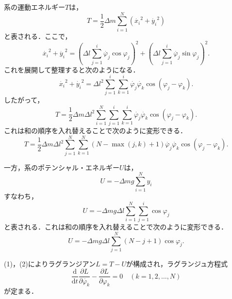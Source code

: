 \documentclass[11pt, a4paper]{ltjsarticle}
\begin{document}
系の運動エネルギー$T$は，
\begin{equation*}
  T = \frac{1}{2} \Delta m \sum_{i = 1}^{N} \left(\dot{x_i}^2 + \dot{y_i}^2\right)
\end{equation*}
と表される．ここで，
\begin{equation*}
  \dot{x_i}^2 + \dot{y_i}^2
  = \left(\Delta l \sum_{j = 1}^{i} \dot{\varphi_j} \cos \varphi_j\right)^2
  + \left(\Delta l \sum_{j = 1}^{i} \dot{\varphi_j} \sin \varphi_j\right)^2.
\end{equation*}
これを展開して整理すると次のようになる．
\begin{equation*}
  \dot{x_i}^2 + \dot{y_i}^2
  = {\Delta l}^2 \sum_{j = 1}^{i} \sum_{k = 1}^{i}
    \dot{\varphi_j} \dot{\varphi_k} \cos \left(\varphi_j - \varphi_k\right).
\end{equation*}
したがって，
\begin{equation*}
  T = \frac{1}{2} \Delta m {\Delta l}^2
      \sum_{i = 1}^{N} \sum_{j = 1}^{i} \sum_{k = 1}^{i}
      \dot{\varphi_j} \dot{\varphi_k} \cos \left(\varphi_j - \varphi_k\right).
\end{equation*}
これは和の順序を入れ替えることで次のように変形できる．
\begin{equation}
  T = \frac{1}{2} \Delta m {\Delta l}^2
      \sum_{j = 1}^{N} \sum_{k = 1}^{N} \left(N - \max \left(j, k\right) + 1\right)
      \dot{\varphi_j} \dot{\varphi_k} \cos \left(\varphi_j - \varphi_k\right).
\end{equation}

一方，系のポテンシャル・エネルギー$U$は，
\begin{equation*}
  U = - \Delta m g \sum_{i = 1}^{N} y_i
\end{equation*}
すなわち，
\begin{equation*}
  U = - \Delta m g \Delta l \sum_{i = 1}^{N} \sum_{j = 1}^{i} \cos \varphi_j
\end{equation*}
と表される．これは和の順序を入れ替えることで次のように変形できる．
\begin{equation}
  U = - \Delta m g \Delta l \sum_{j = 1}^{N} \left(N - j + 1\right)
      \cos \varphi_j.
\end{equation}

(1)，(2)によりラグランジアン$L = T - U$が構成され，ラグランジュ方程式
\begin{equation}
  \frac{\mathrm{d}}{\mathrm{d}t} \frac{\partial L}{\partial \dot{\varphi_k}}
  - \frac{\partial L}{\partial \varphi_k} = 0
  \quad \left(k = 1, 2, \dots, N\right)
\end{equation}
が定まる．
\end{document}
